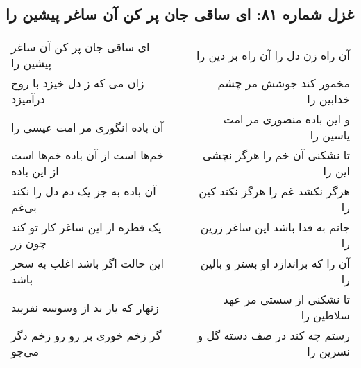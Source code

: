 \begin{center}
\section*{غزل شماره ۸۱: ای ساقی جان پر کن آن ساغر پیشین را}
\label{sec:0081}
\begin{longtable}{l p{0.5cm} r}
ای ساقی جان پر کن آن ساغر پیشین را
&&
آن راه زن دل را آن راه بر دین را
\\
زان می که ز دل خیزد با روح درآمیزد
&&
مخمور کند جوشش مر چشم خدابین را
\\
آن باده انگوری مر امت عیسی را
&&
و این باده منصوری مر امت یاسین را
\\
خم‌ها است از آن باده خم‌ها است از این باده
&&
تا نشکنی آن خم را هرگز نچشی این را
\\
آن باده به جز یک دم دل را نکند بی‌غم
&&
هرگز نکشد غم را هرگز نکند کین را
\\
یک قطره از این ساغر کار تو کند چون زر
&&
جانم به فدا باشد این ساغر زرین را
\\
این حالت اگر باشد اغلب به سحر باشد
&&
آن را که براندازد او بستر و بالین را
\\
زنهار که یار بد از وسوسه نفریبد
&&
تا نشکنی از سستی مر عهد سلاطین را
\\
گر زخم خوری بر رو رو زخم دگر می‌جو
&&
رستم چه کند در صف دسته گل و نسرین را
\\
\end{longtable}
\end{center}
